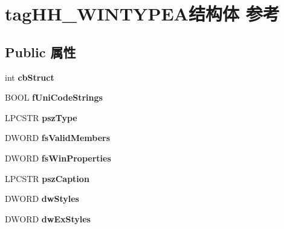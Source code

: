 \hypertarget{structtag_h_h___w_i_n_t_y_p_e_a}{}\section{tag\+H\+H\+\_\+\+W\+I\+N\+T\+Y\+P\+E\+A结构体 参考}
\label{structtag_h_h___w_i_n_t_y_p_e_a}
\subsection*{Public 属性}
\begin{DoxyCompactItemize}
\item 
\mbox{\label{structtag_h_h___w_i_n_t_y_p_e_a_aef6aa2dd6bab1adaf570553c6eb7d34b}} 
int {\bfseries cb\+Struct}
\item 
\mbox{\label{structtag_h_h___w_i_n_t_y_p_e_a_a86c5f8cd6c65ab3a8d1597dfddd66943}} 
B\+O\+OL {\bfseries f\+Uni\+Code\+Strings}
\item 
\mbox{\label{structtag_h_h___w_i_n_t_y_p_e_a_a6c951949eab280721a5a78d42b7af784}} 
L\+P\+C\+S\+TR {\bfseries psz\+Type}
\item 
\mbox{\label{structtag_h_h___w_i_n_t_y_p_e_a_aa1480061f5bb875707da9df4e172c1b4}} 
D\+W\+O\+RD {\bfseries fs\+Valid\+Members}
\item 
\mbox{\label{structtag_h_h___w_i_n_t_y_p_e_a_a2152aa12d21823a686c403e446943011}} 
D\+W\+O\+RD {\bfseries fs\+Win\+Properties}
\item 
\mbox{\label{structtag_h_h___w_i_n_t_y_p_e_a_a77926443a984e252d3daaea1a5350590}} 
L\+P\+C\+S\+TR {\bfseries psz\+Caption}
\item 
\mbox{\label{structtag_h_h___w_i_n_t_y_p_e_a_a6775cad55c8630327e26ab6941bd5de7}} 
D\+W\+O\+RD {\bfseries dw\+Styles}
\item 
\mbox{\label{structtag_h_h___w_i_n_t_y_p_e_a_a23b07c4e76a6ec6653f2e6a8ca24e49b}} 
D\+W\+O\+RD {\bfseries dw\+Ex\+Styles}

\end{DoxyCompactItemize}
